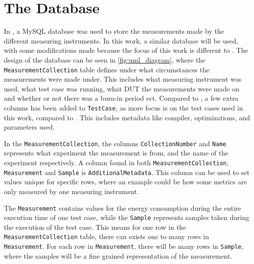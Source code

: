 \section{The Database}\label{app:database}

In \cite{biksbois}, a MySQL database was used to store the measurements made by the different measuring instruments. In this work, a similar database will be used, with some modifications made because the focus of this work is different to \cite{biksbois}. The design of the database can be seen in \cref{fig:uml_diagram}, where the \texttt{MeasurementCollection} table defines under what circumstances the measurements were made under. This includes what measuring instrument was used, what test case was running, what DUT the measurements were made on and whether or not there was a burn-in period ect. Compared to \cite{biksbois}, a few extra columns has been added to \texttt{TestCase}, as more focus is on the test cases used in this work, compared to \cite{biksbois}. This includes metadata like compiler, optimizations, and parameters used.


In the \texttt{MeasurementCollection}, the columns \texttt{CollectionNumber} and \texttt{Name} represents what experiment the measurement is from, and the name of the experiment respectively. A column found in both \texttt{MeasurementCollection}, \texttt{Measurement} and \texttt{Sample} is \texttt{AdditionalMetadata}. This column can be used to set values unique for specific rows, where an example could be how some metrics are only measured by one measuring instrument.



The \texttt{Measurement} contains values for the energy consumption during the entire execution time of one test case, while the \texttt{Sample} represents samples taken during the execution of the test case. This means for one row in the \texttt{MeasurementCollection} table, there can exists one to many rows in \texttt{Measurement}. For each row in \texttt{Measurement}, there will be many rows in \texttt{Sample}, where the samples will be a fine grained representation of the measurement.


